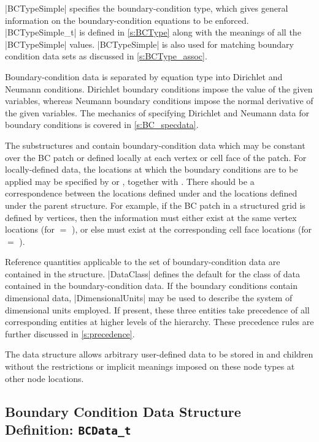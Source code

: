 |BCTypeSimple| specifies the boundary-condition type, which gives general
information on the bound\-ary-con\-di\-tion equations to be enforced.
|BCTypeSimple_t| is defined in \autoref{s:BCType} along with the meanings
of all the |BCTypeSimple| values.  
|BCTypeSimple| is also used for matching boundary condition data sets as 
discussed in \autoref{s:BCType_assoc}.

Boundary-condition data is separated by equation type into Dirichlet
and Neumann conditions.  Dirichlet boundary conditions impose the
value of the given variables, whereas Neumann boundary conditions
impose the normal derivative of the given variables.  The mechanics of
specifying Dirichlet and Neumann data for boundary conditions is covered
in \autoref{s:BC_specdata}.

The substructures  and  contain
boundary-condition data which may be constant over the BC patch or
defined locally at each vertex or cell face of the patch.
For locally-defined data, the locations at which the boundary
conditions are to be applied may be specified by  or
, together with .
There should be a correspondence between the locations defined under
 and the locations defined under the parent
 structure.
For example, if the BC patch in a structured grid is defined by
vertices, then the  information must either exist at
the same vertex locations (for  $=$ ),
or else must exist at the corresponding cell face locations (for
 $=$ ).

Reference quantities applicable to the set of boundary-condition data are
contained in the  structure.
|DataClass| defines the default for the class of data contained in the
boundary-condition data.
If the boundary conditions contain dimensional data, |DimensionalUnits|
may be used to describe the system of dimensional units employed.
If present, these three entities take precedence of all corresponding
entities at higher levels of the hierarchy.
These precedence rules are further discussed in \autoref{s:precedence}.

The  data structure allows arbitrary
user-defined data to be stored in  and
 children without the restrictions or implicit
meanings imposed on these node types at other node locations.

\subsection{Boundary Condition Data Structure Definition: \texttt{BCData\_t}}
\label{s:BCData}

